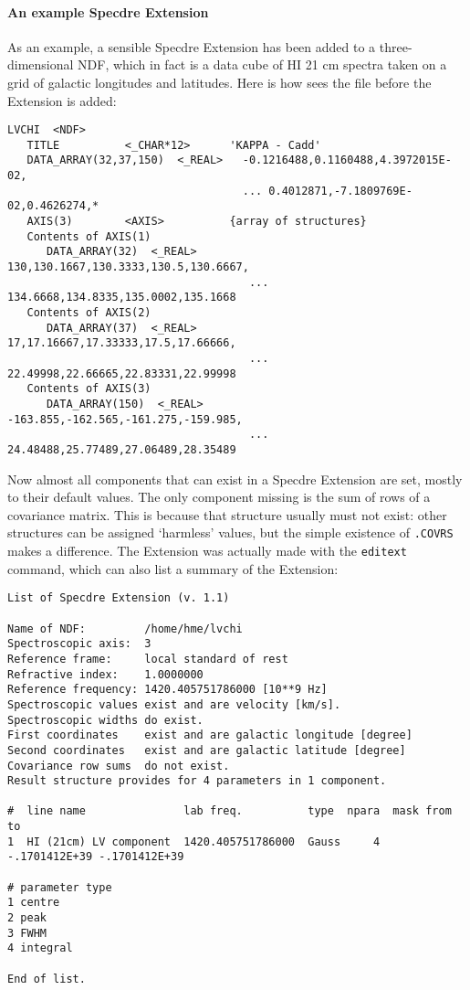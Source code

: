 
\paragraph{An example Specdre Extension}

   As an example, a sensible Specdre Extension has been added to a
   three-dimensional NDF, which in fact is a data cube of HI 21 cm
   spectra taken on a grid of galactic longitudes and latitudes. Here is
   how
{\tt{}}
   sees the file before the Extension is added:

\small
\begin{verbatim}
LVCHI  <NDF>
   TITLE          <_CHAR*12>      'KAPPA - Cadd'
   DATA_ARRAY(32,37,150)  <_REAL>   -0.1216488,0.1160488,4.3972015E-02,
                                    ... 0.4012871,-7.1809769E-02,0.4626274,*
   AXIS(3)        <AXIS>          {array of structures}
   Contents of AXIS(1)
      DATA_ARRAY(32)  <_REAL>        130,130.1667,130.3333,130.5,130.6667,
                                     ... 134.6668,134.8335,135.0002,135.1668
   Contents of AXIS(2)
      DATA_ARRAY(37)  <_REAL>        17,17.16667,17.33333,17.5,17.66666,
                                     ... 22.49998,22.66665,22.83331,22.99998
   Contents of AXIS(3)
      DATA_ARRAY(150)  <_REAL>       -163.855,-162.565,-161.275,-159.985,
                                     ... 24.48488,25.77489,27.06489,28.35489
\end{verbatim}
\normalsize

   Now almost all components that can exist in a Specdre Extension are
   set, mostly to their default values. The only component missing is
   the sum of rows of a covariance matrix. This is because that
   structure usually must not exist: other structures can be assigned
   `harmless' values, but the simple existence of {\tt .COVRS} makes a
   difference. The Extension was actually made with the {\tt editext}
   command, which can also list a summary of the Extension:

\small
\begin{verbatim}
List of Specdre Extension (v. 1.1)

Name of NDF:         /home/hme/lvchi
Spectroscopic axis:  3
Reference frame:     local standard of rest
Refractive index:    1.0000000
Reference frequency: 1420.405751786000 [10**9 Hz]
Spectroscopic values exist and are velocity [km/s].
Spectroscopic widths do exist.
First coordinates    exist and are galactic longitude [degree]
Second coordinates   exist and are galactic latitude [degree]
Covariance row sums  do not exist.
Result structure provides for 4 parameters in 1 component.

#  line name               lab freq.          type  npara  mask from     to
1  HI (21cm) LV component  1420.405751786000  Gauss     4  -.1701412E+39 -.1701412E+39

# parameter type
1 centre
2 peak
3 FWHM
4 integral

End of list.
\end{verbatim}
\normalsize

